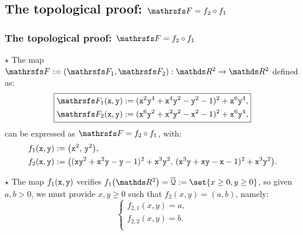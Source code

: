 \documentclass{beamer}
\begin{document}
\subsection{The topological proof: $\FFF=f_2\circ f_1$}
\begin{frame}
\frametitle{The topological proof: $\FFF=f_2\circ f_1$}
$\star$ The map $\FFF:= (\FFF_1, \FFF_2):\R^2\to\R^2$ defined as:
\begin{equation*}\label{eq:thirdMap}
\boxed{
\begin{aligned}
\FFF_1({\tt x}, {\tt y}) := ({\tt x}^2{\tt y}^4+{\tt x}^4{\tt y}^2-{\tt y}^2-1)^2+{\tt x}^6{\tt y}^4,\\
\FFF_2(\x, \y) := ({\tt x}^6{\tt y}^2+{\tt x}^2{\tt y}^2-{\tt x}^2-1)^2+{\tt x}^6{\tt y}^4,
\end{aligned}
}
\end{equation*}
can be expressed as $\FFF = f_2 \circ f_1$, with:
\begin{align*}
&f_1({\tt x},{\tt y}):=\big({\tt x}^2,\,{\tt y}^2\big),\\
&f_2({\tt x},{\tt y}):=\big(({\tt x}{\tt y}^2+{\tt x}^2{\tt y}-{\tt y}-1)^2+{\tt x}^3{\tt y}^2,\,({\tt x}^3{\tt y}+{\tt x}{\tt y}-{\tt x}-1)^2+{\tt x}^3{\tt y}^2\big).
\end{align*}

$\star$ The map $f_1({\tt x},{\tt y})$ verifies $f_1\big(\R^2\big)=\overline{\Qu}:=\set{x\ge 0,y\ge 0}$,
so given $a,b>0$, we must provide $x,y\ge0$ such that $f_2(x,y) = (a,b)$, namely:
\begin{equation*}
\left\{
\begin{aligned}
f_{2,1}(x,y)=a,\\
f_{2,2}(x,y)=b.\\
\end{aligned}
\right.
\end{equation*}

\end{frame}
\end{document}
